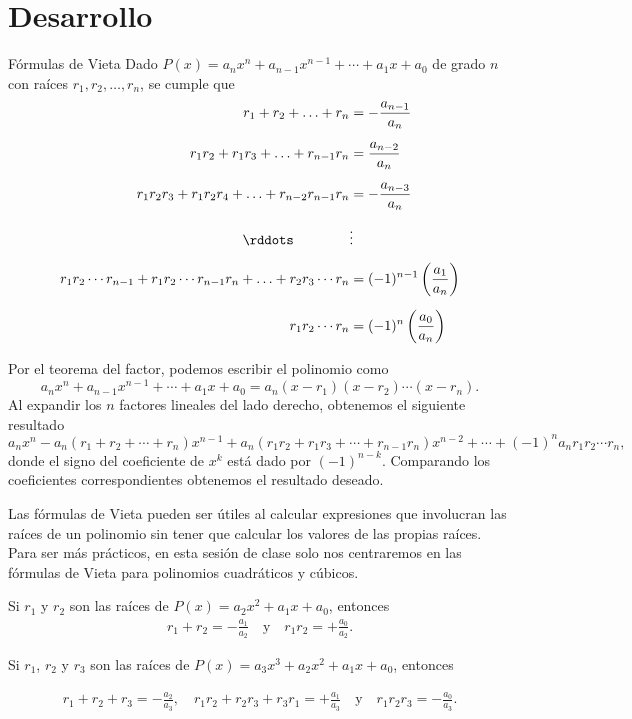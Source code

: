 \section{Desarrollo}

\begin{theorem.tcb}{Fórmulas de Vieta}{}
    Dado $P(x) = a_n x^n + a_{n - 1} x^{n - 1} + \cdots  + a_1 x + a_0$ de grado $n$ con raíces $r_1, r_2, \ldots, r_n$, se cumple que
    \begin{align*}
        r_1 + r_2 + \ldots + r_n &= - \frac{a_{n - 1}}{a_n}\\[2mm]
        r_1 r_2 + r_1 r_3 + \ldots + r_{n - 1} r_n &= \frac{a_{n - 2}}{a_n}\\[2mm]
        r_1 r_2 r_3 + r_1 r_2 r_4 + \ldots + r_{n - 2} r_{n - 1} r_n &= -\frac{a_{n - 3}}{a_n}\\[2mm]
        \rddots\qquad \qquad &\vdots\\[2mm]
        r_1 r_2 \cdots r_{n - 1} + r_1 r_2 \cdots r_{n - 1}r_n + \ldots + r_2 r_3 \cdots r_n &= (-1)^{n - 1} \left(\frac{a_1}{a_n}\right)\\[2mm]
        r_1 r_2 \cdots r_n &= (-1)^n \left(\frac{a_0}{a_n}\right)
    \end{align*}
\end{theorem.tcb}

Por el teorema del factor, podemos escribir el polinomio como
\[
    a_n x^n + a_{n - 1} x^{n - 1} + \cdots  + a_1 x + a_0 = a_n (x - r_1)(x - r_2) \cdots (x - r_n).
\]
Al expandir los $n$ factores lineales del lado derecho, obtenemos el siguiente resultado
\[
    a_n x^n - a_n(r_1 + r_2 + \cdots + r_n)x^{n - 1} + a_n(r_1 r_2 + r_1 r_3 + \cdots + r_{n - 1} r_n)x^{n - 2} + \cdots + (-1)^n a_n r_1 r_2 \cdots r_n,
\]
donde el signo del coeficiente de $x^k$ está dado por $(-1)^{n - k}$.
Comparando los coeficientes correspondientes obtenemos el resultado deseado.

Las fórmulas de Vieta pueden ser útiles al calcular expresiones que involucran las raíces de un polinomio sin tener que calcular los valores de las propias raíces.
Para ser más prácticos, en esta sesión de clase solo nos centraremos en las fórmulas de Vieta para polinomios cuadráticos y cúbicos.

\begin{remark.tcb}
        Si $r_1$ y $r_2$ son las raíces de $P(x) = a_2 x^2 + a_1 x + a_0$, entonces
        \begin{gather*}
            r_1 + r_2 = - \frac{a_1}{a_2} \quad\text{y}\quad r_1 r_2 = +\frac{a_0}{a_2}.
        \end{gather*}

        Si $r_1$, $r_2$ y $r_3$ son las raíces de $P(x) = a_3 x^3 + a_2 x^2 + a_1 x + a_0$, entonces

        \begin{gather*}
            r_1 + r_2 + r_3 = - \frac{a_2}{a_3},\quad
            r_1 r_2 + r_2 r_3 + r_3 r_1 = +\frac{a_1}{a_3}\quad\text{y}\quad
            r_1 r_2 r_3 = - \frac{a_0}{a_3}.
        \end{gather*}
\end{remark.tcb}


